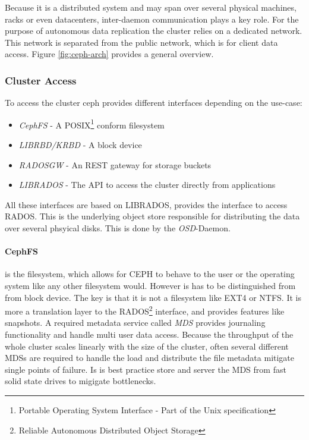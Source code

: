 \documentclass[titlepage, a4paper, 11pt]{scrartcl}
\begin{document}
            Because it is a distributed system and may span over several physical machines, racks or even datacenters, inter-daemon
            communication plays a key role. For the purpose of autonomous data replication the cluster relies on a dedicated network.
            This network is separated from the public network, which is for client data access. Figure \ref{fig:ceph-arch} provides a 
            general overview.


            \subsubsection{Cluster Access}

                To access the cluster ceph provides different interfaces depending on the use-case:

                \begin{itemize}
                    \item \textit{CephFS} - A POSIX\footnote{Portable Operating System Interface - Part of the Unix specification} conform filesystem
                    \item \textit{LIBRBD/KRBD} - A block device
                    \item \textit{RADOSGW} - An REST gateway for storage buckets
                    \item \textit{LIBRADOS} - The API to access the cluster directly from applications
                \end{itemize}

                All these interfaces are based on LIBRADOS, provides the interface to access RADOS. This is the underlying object store
                responsible for distributing the data over several phsyical disks. This is done by the \textit{OSD}-Daemon.

                \paragraph{CephFS} is the filesystem, which allows for CEPH to behave to the user or the operating system like any other
                filesystem would. However is has to be distinguished from from block device. 
                The key is that it is not a filesystem like EXT4 or NTFS. It is more a translation layer to the
                RADOS\footnote{Reliable Autonomous Distributed Object Storage} interface, and provides features like snapshots. A required metadata service called \textit{MDS} provides journaling functionality and handle
                multi user data access. Because the throughput of the whole cluster scales linearly with the size of the cluster,
                often several different MDSs are required to handle the load and distribute the file metadata mitigate
                single points of failure. Is is best practice store and server the MDS from fast solid state drives to migigate bottlenecks.
\end{document}
